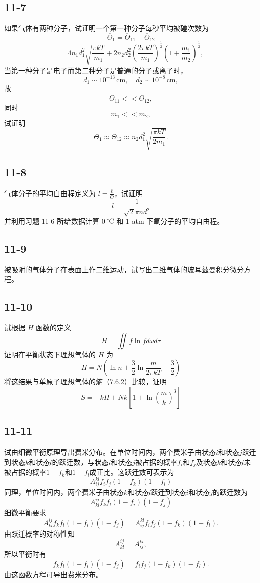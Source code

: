\newpage
\subsection{11-7}
如果气体有两种分子，试证明一个第一种分子每秒平均被碰次数为
$$ \overline{\Theta}_1 = \overline{\Theta}_{11} + \overline{\Theta}_{12} $$
$$ = 4n_1d_1^2\sqrt{\frac{\pi kT}{m_1}} + 2n_2d_2^2\left(\frac{2\pi kT}{m_1}\right)^{\frac{1}{2}}\left(1+\frac{m_1}{m_2}\right)^{\frac{1}{2}}, $$
当第一种分子是电子而第二种分子是普通的分子或离子时，
$$ d_1 \sim 10^{-13} \, \text{cm}, \quad d_2 \sim 10^{-8} \, \text{cm}, $$
故
$$ \overline{\Theta}_{11} << \overline{\Theta}_{12}, $$
同时
$$ m_1 << m_2, $$
试证明
$$ \overline{\Theta}_1 \approx \overline{\Theta}_{12} \approx n_2d_1^2\sqrt{\frac{\pi kT}{2m_1}}. $$

\newpage
\subsection{11-8}
气体分子的平均自由程定义为 $ l = \frac{\bar{v}}{\Theta} $，试证明
$$ l = \frac{1}{\sqrt{2}\pi n d^2} $$
并利用习题 11-6 所给数据计算 0 ℃ 和 1 atm 下氧分子的平均自由程。

\newpage
\subsection{11-9}
被吸附的气体分子在表面上作二维运动，试写出二维气体的玻耳兹曼积分微分方程。

\newpage
\subsection{11-10}
试根据 $H$ 函数的定义
$$ H = \iint f \ln f  d\omega d\tau $$
证明在平衡状态下理想气体的 $H$ 为
$$ H = N \left( \ln n + \frac{3}{2} \ln \frac{m}{2 \pi k T} - \frac{3}{2} \right) $$
将这结果与单原子理想气体的熵（7.6.2）比较，证明
$$ S = -kH + Nk \left[ 1 + \ln \left( \frac{m}{k} \right)^3 \right] $$

\newpage
\subsection{11-11}
试由细微平衡原理导出费米分布。在单位时间内，两个费米子由状态$i$和状态$j$跃迁到状态$k$和状态$l$的跃迁数，与状态$i$和状态$j$被占据的概率$f_i$和$f_j$及状态$k$和状态$l$未被占据的概率$1-f_k$和$1-f_l$成正比。这跃迁数可表示为
$$ A_{ij}^{kl} f_i f_j (1-f_k) (1-f_l) $$
同理，单位时间内，两个费米子由状态$k$和状态$l$跃迁到状态$i$和状态$j$的跃迁数为
$$ A_{kl}^{ij} f_k f_l (1-f_i) (1-f_j) $$
细微平衡要求
$$ A_{kl}^{ij} f_k f_l (1-f_i) (1-f_j) = A_{ij}^{kl} f_i f_j (1-f_k) (1-f_l). $$
由跃迁概率的对称性知
$$ A_{kl}^{ij} = A_{ij}^{kl}, $$
所以平衡时有
$$ f_k f_l (1-f_i) (1-f_j) = f_i f_j (1-f_k) (1-f_l). $$
由这函数方程可导出费米分布。

